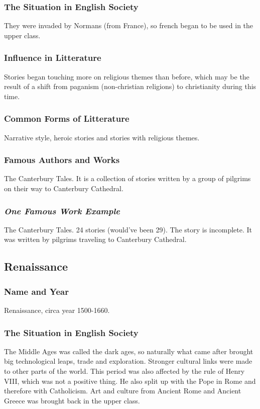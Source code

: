 \subsubsection{The Situation in English Society}
They were invaded by Normans (from France), so french began to be used in the upper class.

\subsubsection{Influence in Litterature}
Stories began touching more on religious themes than before, which may be the result of a shift from paganism (non-christian religions) to christianity during this time.

\subsubsection{Common Forms of Litterature}
Narrative style, heroic stories and stories with religious themes.

\subsubsection{Famous Authors and Works}
The Canterbury Tales. It is a collection of stories written by a group of pilgrims on their way to Canterbury Cathedral.

\subsubsection{\textit{One Famous Work Example}}
The Canterbury Tales. 24 stories (would've been 29). The story is incomplete. It was written by pilgrims traveling to Canterbury Cathedral.

\newpage
\subsection{Renaissance}

\subsubsection{Name and Year}
Renaissance, circa year 1500-1660.

\subsubsection{The Situation in English Society}
The Middle Ages was called the dark ages, so naturally what came after brought big technological leaps, trade and exploration. Stronger cultural links were made to other parts of the world. This period was also affected by the rule of Henry VIII, which was not a positive thing. He also split up with the Pope in Rome and therefore with Catholicism. 
Art and culture from Ancient Rome and Ancient Greece was brought back in the upper class.

